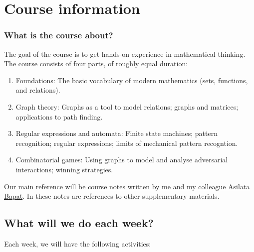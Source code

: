 \documentclass{amsart}
\begin{document}
\section{Course information}
\label{sec:orga887e0e}
\subsubsection{What is the course about?}
\label{sec:org47e5b46}

The goal of the course is to get hands-on experience in mathematical thinking.
The course consists of four parts, of roughly equal duration:

\begin{enumerate}
\item Foundations:  The basic vocabulary of modern mathematics (sets, functions, and relations).
\item Graph theory: Graphs as a tool to model relations; graphs and matrices; applications to path finding.
\item Regular expressions and automata: Finite state machines; pattern recognition; regular expressions; limits of mechanical pattern recogntion.
\item Combinatorial games: Using graphs to model and analyse adversarial interactions; winning strategies.
\end{enumerate}

Our main reference will be \href{https://canvas.anu.edu.au/files/715877/}{course notes written by me and my colleague Asilata Bapat}.
In these notes are references to other supplementary materials.
\subsection*{What will we do each week?}
\label{sec:org694411e}
Each week, we will have the following activities:
\end{document}
